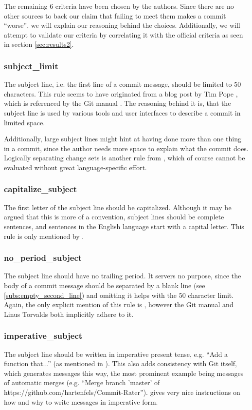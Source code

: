 The remaining 6 criteria have been chosen by the authors. Since there are no other sources to back our claim that failing to meet them makes a commit ``worse'', we will explain our reasoning behind the choices. Additionally, we will attempt to validate our criteria by correlating it with the official criteria as seen in section \ref{sec:results2}.

\subsubsection{subject\_limit}
\label{subs:subject_limit}
The subject line, i.e. the first line of a commit message, should be limited to 50 characters. This rule seems to have originated from a blog post by Tim Pope \cite{TP}, which is referenced by the Git manual \cite{OffGuide}. The reasoning behind it is, that the subject line is used by various tools and user interfaces to describe a commit in limited space.

Additionally, large subject lines might hint at having done more than one thing in a commit, since the author needs more space to explain what the commit does. Logically separating change sets is another rule from \cite{OffGuide}, which of course cannot be evaluated without great language-specific effort.

\subsubsection{capitalize\_subject}
\label{subs:capitalize_subject}
The first letter of the subject line should be capitalized. Although it may be argued that this is more of a convention, subject lines should be complete sentences, and sentences in the English language start with a capital letter. This rule is only mentioned by \cite{CB}.

\subsubsection{no\_period\_subject}
\label{subs:no_period_subject}
The subject line should have no trailing period. It servers no purpose, since the body of a commit message should be separated by a blank line (see \ref{subs:empty_second_line}) and omitting it helps with the 50 character limit. Again, the only explicit mention of this rule is \cite{CB}, however the Git manual \cite{OffGuide} and Linus Torvalds \cite{SR} both implicitly adhere to it.

\subsubsection{imperative\_subject}
\label{subs:imperative_subject}
The subject line should be written in imperative present tense, e.g. ``Add a function that...'' (as mentioned in \cite{OffGuide}). This also adds consistency with Git itself, which generates messages this way, the most prominent example being messages of automatic merges (e.g. ``Merge branch 'master' of https://github.com/hartenfels/Commit-Rater''). \cite{CB} gives very nice instructions on how and why to write messages in imperative form.

